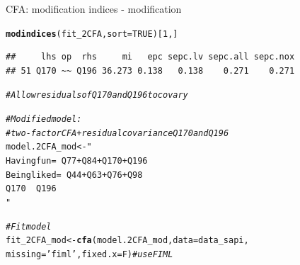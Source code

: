 \documentclass[10pt]{beamer}\usepackage[]{graphicx}\usepackage[]{xcolor}
\makeatletter
\newcommand{\hlnum}[1]{\textcolor[rgb]{0.686,0.059,0.569}{#1}}%
\newcommand{\hlstr}[1]{\textcolor[rgb]{0.192,0.494,0.8}{#1}}%
\newcommand{\hlcom}[1]{\textcolor[rgb]{0.678,0.584,0.686}{\textit{#1}}}%
\newcommand{\hlstd}[1]{\textcolor[rgb]{0.345,0.345,0.345}{#1}}%
\newcommand{\hlkwb}[1]{\textcolor[rgb]{0.69,0.353,0.396}{#1}}%
\newcommand{\hlkwc}[1]{\textcolor[rgb]{0.333,0.667,0.333}{#1}}%
\newcommand{\hlkwd}[1]{\textcolor[rgb]{0.737,0.353,0.396}{\textbf{#1}}}%
\newenvironment{kframe}{%
 \def\at@end@of@kframe{}%
 \ifinner\ifhmode%
  \def\at@end@of@kframe{\end{minipage}}%
  \begin{minipage}{\columnwidth}%
 \fi\fi%
 \def\FrameCommand##1{\hskip\@totalleftmargin \hskip-\fboxsep
 \colorbox{shadecolor}{##1}\hskip-\fboxsep
     \hskip-\linewidth \hskip-\@totalleftmargin \hskip\columnwidth}%
 \MakeFramed {\advance\hsize-\width
   \@totalleftmargin\z@ \linewidth\hsize
   \@setminipage}}%
 {\par\unskip\endMakeFramed%
 \at@end@of@kframe}
\newenvironment{knitrout}{}{} %
\makeatother
\begin{document}
\begin{frame}[fragile]{CFA: modification indices - modification}

\begin{knitrout}
\color{fgcolor}\begin{kframe}
\begin{alltt}
\hlkwd{modindices}\hlstd{(fit_2CFA,} \hlkwc{sort} \hlstd{=} \hlnum{TRUE}\hlstd{)[}\hlnum{1}\hlstd{,]}
\end{alltt}
\begin{verbatim}
##     lhs op  rhs     mi   epc sepc.lv sepc.all sepc.nox
## 51 Q170 ~~ Q196 36.273 0.138   0.138    0.271    0.271
\end{verbatim}
\begin{alltt}
\hlcom{# Allow residuals of Q170 and Q196 to covary}
\end{alltt}
\end{kframe}
\end{knitrout}

\begin{knitrout}
\color{fgcolor}\begin{kframe}
\begin{alltt}
\hlcom{# Modified model: }
\hlcom{# two-factor CFA + residual covariance Q170 and Q196}
\hlstd{model.2CFA_mod} \hlkwb{<-} \hlstr{"
 Having fun  =~ Q77 + Q84 + Q170 + Q196 
 Being liked =~ Q44 + Q63 + Q76  + Q98
 Q170 ~~ Q196
"}

\hlcom{# Fit model}
\hlstd{fit_2CFA_mod} \hlkwb{<-} \hlkwd{cfa}\hlstd{(model.2CFA_mod,} \hlkwc{data}\hlstd{=data_sapi,}
                    \hlkwc{missing}\hlstd{=}\hlstr{'fiml'}\hlstd{,} \hlkwc{fixed.x}\hlstd{=F)}  \hlcom{# use FIML }
\end{alltt}
\end{kframe}
\end{knitrout}

\end{frame}
%
\end{document}
